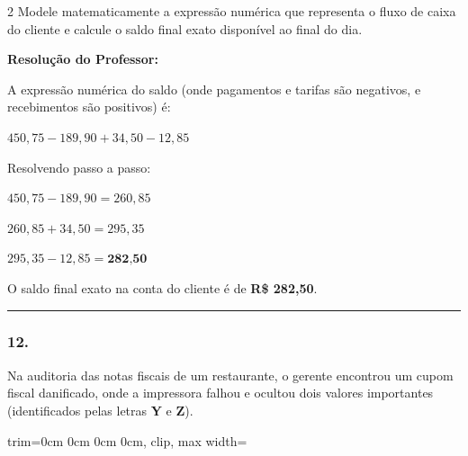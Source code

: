 \begin{multicols*}{2}
Modele matematicamente a expressão numérica que representa o fluxo de caixa do cliente e calcule o saldo final exato disponível ao final do dia.

\ifgabarito
    \begin{tcolorbox}[colback=CorTitUm!5, colframe=CorTitUm, boxrule=1pt, arc=4pt, left=6pt, right=6pt, top=6pt, bottom=6pt]
    \small\textbf{\textcolor{CorTitUm}{Resolução do Professor:}}\par\vspace{0.1cm}
    \color{CinzaEscuro}
    A expressão numérica do saldo (onde pagamentos e tarifas são negativos, e recebimentos são positivos) é:
    
    $450,75 - 189,90 + 34,50 - 12,85$
    
    Resolvendo passo a passo:
    
    $450,75 - 189,90 = 260,85$
    
    $260,85 + 34,50 = 295,35$
    
    $295,35 - 12,85 = \textbf{282,50}$
    
    O saldo final exato na conta do cliente é de \textbf{R\$ 282,50}.
    \end{tcolorbox}
\fi

\par\vspace{\espacoQuestao}

\noindent\textcolor{CorLinha}{\rule{\linewidth}{0.5pt}} 
\par\vspace{\espacoPreQuestao}
\subsubsection*{12.} Na auditoria das notas fiscais de um restaurante, o gerente encontrou um cupom fiscal danificado, onde a impressora falhou e ocultou dois valores importantes (identificados pelas letras \textbf{Y} e \textbf{Z}).

\begin{center}
\begin{adjustbox}{trim=0cm 0cm 0cm 0cm, clip, max width=\larguraTikz}
\end{adjustbox}
\end{center}
\end{multicols*}
